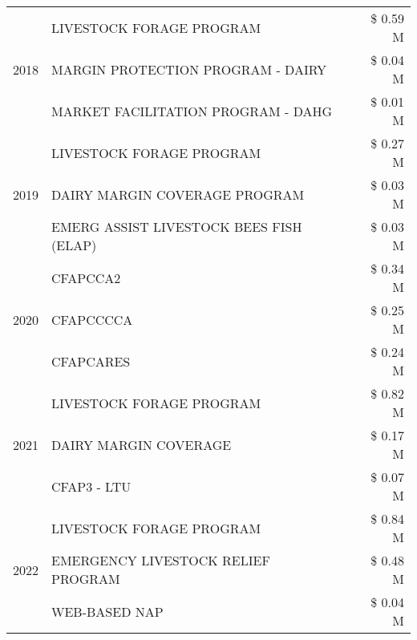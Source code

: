 \begin{tabular}{llr}
\cline{1-3}
\multirow[t]{3}{*}{2018} & LIVESTOCK FORAGE PROGRAM & \$ 0.59 M \\
 & MARGIN PROTECTION PROGRAM - DAIRY & \$ 0.04 M \\
 & MARKET FACILITATION PROGRAM - DAHG & \$ 0.01 M \\
\cline{1-3}
\multirow[t]{3}{*}{2019} & LIVESTOCK FORAGE PROGRAM & \$ 0.27 M \\
 & DAIRY MARGIN COVERAGE PROGRAM & \$ 0.03 M \\
 & EMERG ASSIST LIVESTOCK BEES FISH (ELAP) & \$ 0.03 M \\
\cline{1-3}
\multirow[t]{3}{*}{2020} & CFAPCCA2 & \$ 0.34 M \\
 & CFAPCCCCA & \$ 0.25 M \\
 & CFAPCARES & \$ 0.24 M \\
\cline{1-3}
\multirow[t]{3}{*}{2021} & LIVESTOCK FORAGE PROGRAM & \$ 0.82 M \\
 & DAIRY MARGIN COVERAGE & \$ 0.17 M \\
 & CFAP3 - LTU & \$ 0.07 M \\
\cline{1-3}
\multirow[t]{3}{*}{2022} & LIVESTOCK FORAGE PROGRAM & \$ 0.84 M \\
 & EMERGENCY LIVESTOCK RELIEF PROGRAM & \$ 0.48 M \\
 & WEB-BASED NAP & \$ 0.04 M \\
\cline{1-3}
\bottomrule
\end{tabular}
